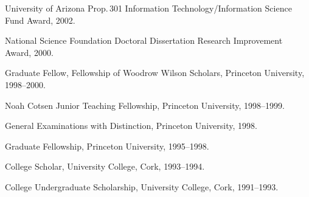 \documentclass[11pt,article,oneside]{memoir}
\begin{document}
\ind University of Arizona Prop.\,301 Information Technology/Information Science Fund Award, 2002.

\ind National Science Foundation Doctoral Dissertation Research Improvement Award, 2000.

\ind Graduate Fellow, Fellowship of Woodrow Wilson Scholars, Princeton University,  1998--2000. 

\ind Noah Cotsen Junior Teaching Fellowship, Princeton University, 1998--1999.

\ind General Examinations with Distinction, Princeton University, 1998.

\ind Graduate Fellowship, Princeton University, 1995--1998.

\ind College Scholar, University College, Cork, 1993--1994.

\ind College Undergraduate Scholarship, University
College, Cork, 1991--1993.

\bigskip 


\medskip

\medskip


\medskip

\medskip
\end{document}
